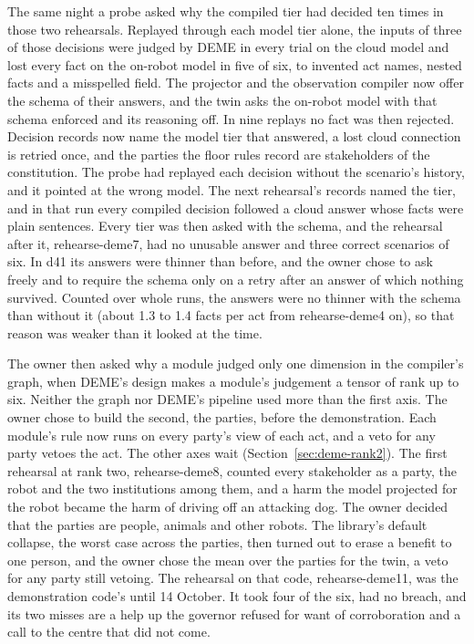 The same night a probe asked why the compiled tier had decided ten times in those two rehearsals.
Replayed through each model tier alone, the inputs of three of those decisions were judged by DEME
in every trial on the cloud model and lost every fact on the on-robot model in five of six, to invented act
names, nested facts and a misspelled field.
The projector and the observation compiler now offer the schema of their answers, and the twin asks
the on-robot model with that schema enforced and its reasoning off. In nine replays no fact was then
rejected.
Decision records now name the model tier that answered, a lost cloud connection is retried once,
and the parties the floor rules record are stakeholders of the constitution.
The probe had replayed each decision without the scenario's history, and it pointed at the wrong
model. The next rehearsal's records named the tier, and in that run every compiled decision followed
a cloud answer whose facts were plain sentences. Every tier was then asked with the schema, and the
rehearsal after it, rehearse-deme7, had no unusable answer and three correct scenarios of six. In
d41 its answers were thinner than before, and the owner chose to ask freely and to require the
schema only on a retry after an answer of which nothing survived. Counted over whole runs, the
answers were no thinner with the schema than without it (about 1.3 to 1.4 facts per act from
rehearse-deme4 on), so that reason was weaker than it looked at the time.

The owner then asked why a module judged only one dimension in the compiler's graph, when DEME's
design makes a module's judgement a tensor of rank up to six. Neither the graph nor DEME's pipeline
used more than the first axis. The owner chose to build the second, the parties, before the
demonstration. Each module's rule now runs on every party's view of each act, and a veto for any
party vetoes the act. The other axes wait (Section~\ref{sec:deme-rank2}).
The first rehearsal at rank two, rehearse-deme8, counted every stakeholder as a party, the robot
and the two institutions among them, and a harm the model projected for the robot became the harm
of driving off an attacking dog. The owner decided that the parties are people, animals and other
robots. The library's default collapse, the worst case across the parties, then turned out to
erase a benefit to one person, and the owner chose the mean over the parties for the twin, a veto
for any party still vetoing. The rehearsal on that code, rehearse-deme11, was the demonstration
code's until 14 October. It took four of the six, had no breach, and its two misses are a help up the governor
refused for want of corroboration and a call to the centre that did not come.

